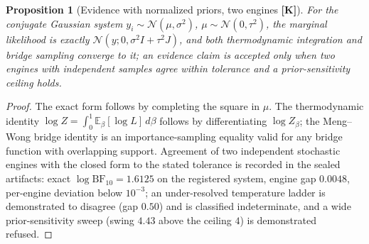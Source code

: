 \documentclass[10pt]{article}
\newtheorem{proposition}[theorem]{Proposition}
\theoremstyle{definition}
\newcommand{\tier}[1]{\textbf{[#1]}}
\begin{document}
\begin{proposition}[Evidence with normalized priors, two engines
\tier{K}]
\label{prop:evid}
For the conjugate Gaussian system $y_i \sim \mathcal N(\mu,\sigma^2)$,
$\mu \sim \mathcal N(0,\tau^2)$, the marginal likelihood is exactly
$\mathcal N(y; 0, \sigma^2 I + \tau^2 J)$, and both thermodynamic
integration and bridge sampling converge to it; an evidence claim is
accepted only when two engines with independent samples agree within
tolerance and a prior-sensitivity ceiling holds.
\end{proposition}
\begin{proof}
The exact form follows by completing the square in $\mu$. The
thermodynamic identity $\log Z = \int_0^1 \mathbb E_\beta[\log L]\,
d\beta$ follows by differentiating $\log Z_\beta$; the
Meng--Wong bridge identity \cite{MengWong1996} is an importance-sampling equality valid
for any bridge function with overlapping support. Agreement of two
independent stochastic engines with the closed form to the stated
tolerance is recorded in the sealed artifacts: exact
$\log\mathrm{BF}_{10} = 1.6125$ on the registered system, engine gap
$0.0048$, per-engine deviation below $10^{-3}$; an under-resolved
temperature ladder is demonstrated to disagree (gap $0.50$) and is
classified indeterminate, and a wide prior-sensitivity sweep
(swing $4.43$ above the ceiling $4$) is demonstrated refused.
\end{proof}
\end{document}
